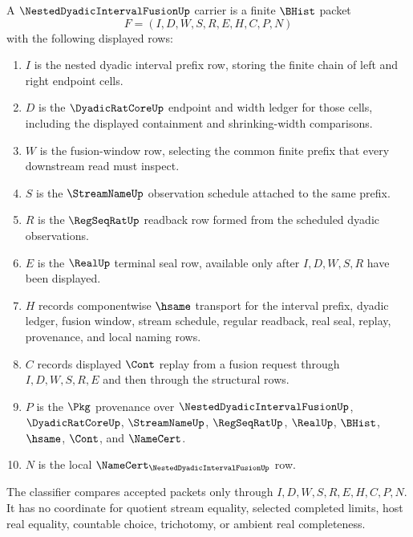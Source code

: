 \begin{definition}
\label{def:nested-dyadic-interval-fusion-carrier}
A $\NestedDyadicIntervalFusionUp$ carrier is a finite $\BHist$ packet
$$
F=(I,D,W,S,R,E,H,C,P,N)
$$
with the following displayed rows:
\begin{enumerate}
\item $I$ is the nested dyadic interval prefix row, storing the finite chain of left and right endpoint cells.
\item $D$ is the $\DyadicRatCoreUp$ endpoint and width ledger for those cells, including the displayed containment and shrinking-width comparisons.
\item $W$ is the fusion-window row, selecting the common finite prefix that every downstream read must inspect.
\item $S$ is the $\StreamNameUp$ observation schedule attached to the same prefix.
\item $R$ is the $\RegSeqRatUp$ readback row formed from the scheduled dyadic observations.
\item $E$ is the $\RealUp$ terminal seal row, available only after $I,D,W,S,R$ have been displayed.
\item $H$ records componentwise $\hsame$ transport for the interval prefix, dyadic ledger, fusion window, stream schedule, regular readback, real seal, replay, provenance, and local naming rows.
\item $C$ records displayed $\Cont$ replay from a fusion request through $I,D,W,S,R,E$ and then through the structural rows.
\item $P$ is the $\Pkg$ provenance over $\NestedDyadicIntervalFusionUp$, $\DyadicRatCoreUp$, $\StreamNameUp$, $\RegSeqRatUp$, $\RealUp$, $\BHist$, $\hsame$, $\Cont$, and $\NameCert$.
\item $N$ is the local $\NameCert_{\NestedDyadicIntervalFusionUp}$ row.
\end{enumerate}
The classifier compares accepted packets only through $I,D,W,S,R,E,H,C,P,N$. It has no coordinate for quotient stream equality, selected completed limits, host real equality, countable choice, trichotomy, or ambient real completeness.
\end{definition}

